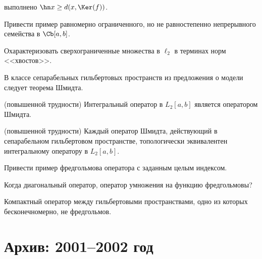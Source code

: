 \documentclass[a4paper]{article}
\begin{document}
\begin{nums}{-1}
выполнено $\hn x \ge d(x,\Ker(f))$.
\item Привести пример равномерно ограниченного, но не равностепенно непрерывного семейства в $\Cb[a,b]$.
\item Охарактеризовать сверхограниченные множества в $\ell_2$ в терминах норм <<хвостов>>.
\item В классе сепарабельных гильбертовых пространств из предложения о модели следует теорема Шмидта.
\item (повышенной трудности) Интегральный оператор в $L_2[a,b]$ является оператором Шмидта.
\item (повышенной трудности) Каждый оператор Шмидта, действующий в сепарабельном гильбертовом пространстве, топологически
эквивалентен интегральному оператору в $L_2[a,b]$.
\item Привести пример фредгольмова оператора с заданным целым индексом.
\item Когда диагональный оператор, оператор умножения на функцию фредгольмовы?
\item Компактный оператор между гильбертовыми пространствами, одно из которых бесконечномерно, не фредгольмов.
\end{nums}

\medskip\dmvntrail

\newpage

\section*{Архив: 2001--2002 год}
\end{document}
